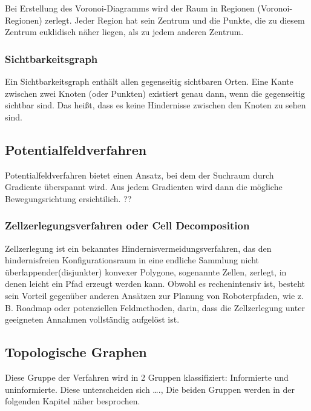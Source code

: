 Bei Erstellung des Voronoi-Diagramms wird der Raum in Regionen (Voronoi-Regionen) zerlegt. Jeder Region hat sein Zentrum und die Punkte, die zu diesem Zentrum euklidisch näher liegen, als zu jedem anderen Zentrum. \cite{voronoi}

\subsubsection{Sichtbarkeitsgraph} 
Ein Sichtbarkeitsgraph enthält allen gegenseitig sichtbaren Orten. Eine Kante zwischen zwei Knoten (oder Punkten) existiert genau dann, wenn die gegenseitig sichtbar sind. Das heißt, dass es keine Hindernisse zwischen den Knoten zu sehen sind. \cite{visG1}\cite{visG2}

\subsection{Potentialfeldverfahren}
Potentialfeldverfahren bietet einen Ansatz, bei dem der Suchraum durch Gradiente überspannt wird. Aus jedem Gradienten wird dann die mögliche Bewegungsrichtung ersichtilich. ?? \cite{potField}

\subsubsection{Zellzerlegungsverfahren oder Cell Decomposition }

Zellzerlegung ist ein bekanntes Hindernisvermeidungsverfahren, das den hindernisfreien Konfigurationsraum in eine endliche Sammlung nicht überlappender(disjunkter) konvexer Polygone, sogenannte Zellen, zerlegt, in denen leicht ein Pfad erzeugt werden kann. Obwohl es rechenintensiv ist, besteht sein Vorteil gegenüber anderen Ansätzen zur Planung von Roboterpfaden, wie z. B. Roadmap oder potenziellen Feldmethoden, darin, dass die Zellzerlegung unter geeigneten Annahmen vollständig aufgelöst ist. \cite{cd}

\subsection{Topologische Graphen}
Diese Gruppe der Verfahren wird in 2 Gruppen klassifiziert: Informierte und uninformierte. Diese unterscheiden sich …., Die beiden Gruppen werden in der folgenden Kapitel näher besprochen.